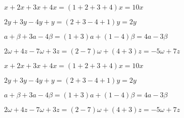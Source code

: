 \begin{alist}
\item $ x+2x+3x+4x=(1+2+3+4)x=10x $
\item $ 2y+3y-4y+y=(2+3-4+1)y=2y $
\item $ a+\beta+3a-4\beta=(1+3)a+(1-4)\beta=4a-3\beta $
\item $ 2\omega+4z-7\omega+3z=(2-7)\omega+(4+3)z=-5\omega+7z $
\end{alist}
\begin{alist}
\item $ x+2x+3x+4x=(1+2+3+4)x=10x $
\item $ 2y+3y-4y+y=(2+3-4+1)y=2y $
\item $ a+\beta+3a-4\beta=(1+3)a+(1-4)\beta=4a-3\beta $
\item $ 2\omega+4z-7\omega+3z=(2-7)\omega+(4+3)z=-5\omega+7z $
\end{alist}
